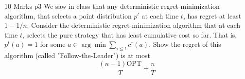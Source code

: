 \documentclass[a4paper, 11pt]{article}
\begin{document}


\begin{problem}{%
		\hfill 10 Marks
	}{p3%
	}
We saw in class that any deterministic regret-minimization algorithm, that selects a point distribution $p^t$ at each time $t$, has regret at least $1-1 / n$. Consider the deterministic regret-minimization algorithm that at each time $t$, selects the pure strategy that has least cumulative cost so far. That is, $p^t(a)=1$ for some $a \in \arg \min \sum\limits_{\tau \leq t} c^\tau(a)$. Show the regret of this algorithm (called "Follow-the-Leader") is at most
$$
\frac{(n-1) \mathrm{OPT}}{T}+\frac{n}{T}
$$
\end{problem}
\end{document}
